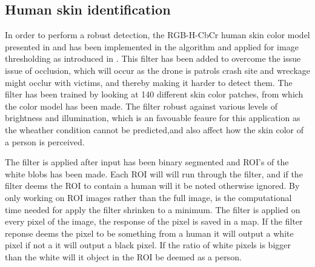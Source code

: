 \subsection{Human skin identification}
In order to perform a robust detection, the RGB-H-CbCr human skin color model presented in \cite{Ref:SkinColorModel} and \cite{Ref:SkinDetection} has been implemented in the algorithm and applied for image thresholding as introduced in \cite{Ref:SkinDetection}. This filter has been added to overcome the issue issue of occlusion, which will occur as the drone is patrols crash site and wreckage might occlur with victims, and thereby making it harder to detect them. The filter has been trained by looking at 140 different skin color patches, from which the color model has been made. The filter robust against  various levels of brightness and illumination, which is an favouable feaure for this application as the wheather condition cannot be predicted,and also affect how the skin color of a person is perceived. 


The filter is applied after input has been binary segmented and  ROI's of the white blobs has been made. Each ROI will will run through the filter, and if the filter deems the ROI to contain a human will it be noted otherwise ignored.  By only working on ROI images rather than the full image, is the computational time needed for apply the filter shrinken to a minimum. The filter is applied on every pixel of the image, the response of the pixel is saved in a map. If the filter reponse deems the pixel to be something from a human it will output a white pixel if not a it will output a black pixel.  If the ratio of white pixels is bigger than the white will it object in the ROI be deemed as a person. 

